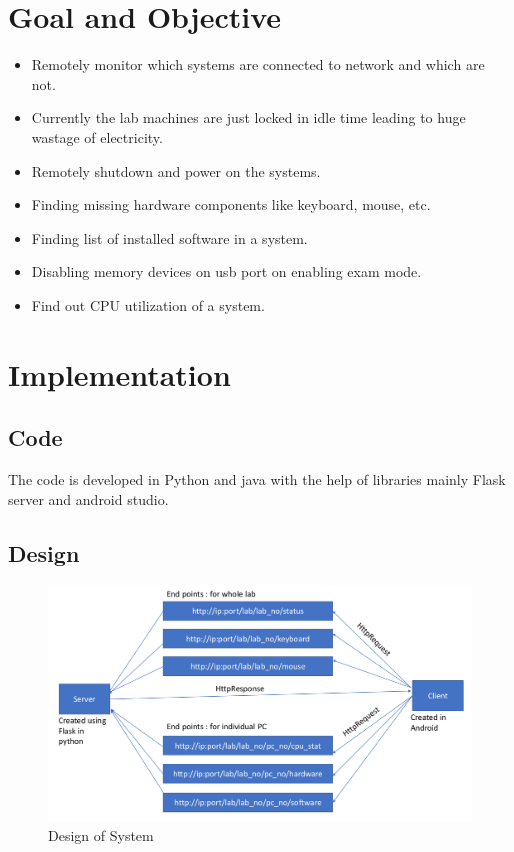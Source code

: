 \documentclass[oneside,a4paper,12pt]{article}
\begin{document}
\section{Goal and Objective}
\begin{itemize}
    \item Remotely monitor which systems are connected to network and which are not.
    \item Currently the lab machines are just locked in idle time leading to huge wastage of electricity.
    \item Remotely shutdown and power on the systems.
    \item Finding missing hardware components like keyboard, mouse, etc.
    \item Finding list of installed software in a system.
    \item Disabling memory devices on usb port on enabling exam mode.
    \item Find out CPU utilization of a system.
\end{itemize}

\newpage
\section{Implementation}
\subsection{Code}
The code is developed in Python and java with the help of libraries mainly Flask server and android studio.
\subsection{Design}
\begin{figure}[H]
        \centering
        \includegraphics[scale=0.5]{assets/design.png}
        \caption{Design of System}
\end{figure}
\end{document}
